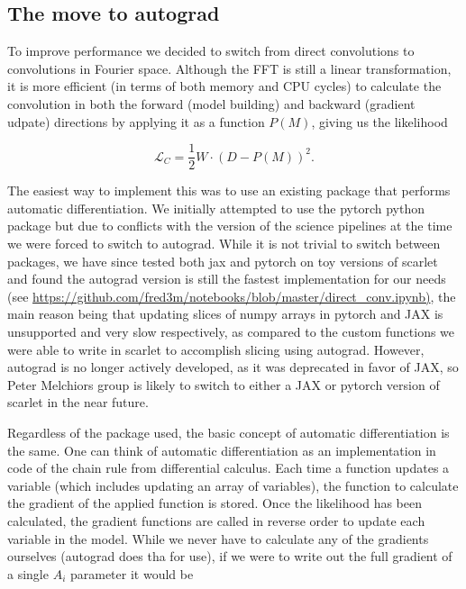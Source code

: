 \documentclass[DM,authoryear,toc]{lsstdoc}
\begin{document}
\subsection{The move to autograd}

To improve performance we decided to switch from direct convolutions to convolutions in Fourier space. Although the FFT is still a linear transformation, it is more efficient (in terms of both memory and CPU cycles) to calculate the convolution in both the forward (model building) and backward (gradient udpate) directions by applying it as a function $P(M)$, giving us the likelihood

\begin{equation}
  \mathcal{L}_C = \frac{1}{2}W\cdot(D-P(M))^2. \label{eq:logL}
\end{equation}

The easiest way to implement this was to use an existing package that performs automatic differentiation. We initially attempted to use the pytorch python package but due to conflicts with the version of the science pipelines at the time we were forced to switch to autograd. While it is not trivial to switch between packages, we have since tested both jax and pytorch on toy versions of scarlet and found the autograd version is still the fastest implementation for our needs (see \url{https://github.com/fred3m/notebooks/blob/master/direct_conv.ipynb)}, the main reason being that updating slices of numpy arrays in pytorch and JAX is unsupported and very slow respectively, as compared to the custom functions we were able to write in scarlet to accomplish slicing using autograd. However, autograd is no longer actively developed, as it was deprecated in favor of JAX, so Peter Melchiors group is likely to switch to either a JAX or pytorch version of scarlet in the near future.

Regardless of the package used, the basic concept of automatic differentiation is the same. One can think of automatic differentiation as an implementation in code of the chain rule from differential calculus. Each time a function updates a variable (which includes updating an array of variables), the function to calculate the gradient of the applied function is stored. Once the likelihood has been calculated, the gradient functions are called in reverse order to update each variable in the model. While we never have to calculate any of the gradients ourselves (autograd does tha for use), if we were to write out the full gradient of a single $A_i$ parameter it would be
\end{document}
